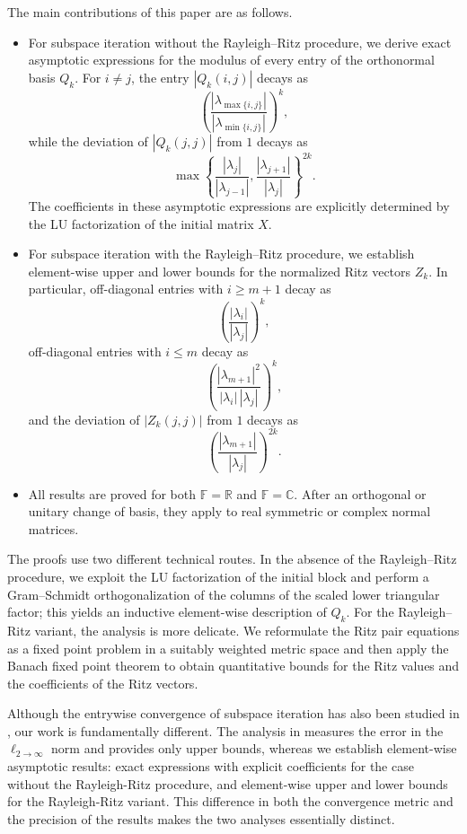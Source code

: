 \documentclass[11pt,a4paper]{article}
\theoremstyle{plain}              %
\theoremstyle{definition}         %
\begin{document}
The main contributions of this paper are as follows.
\begin{itemize}
\item For subspace iteration without the Rayleigh--Ritz procedure, we derive exact asymptotic expressions for the modulus of every entry of the orthonormal basis \(Q_k\). For \(i\ne j\), the entry \(|Q_k(i,j)|\) decays as
\[
\left(\frac{|\lambda_{\max\{i,j\}}|}{|\lambda_{\min\{i,j\}}|}\right)^k,
\]
while the deviation of \(|Q_k(j,j)|\) from \(1\) decays as
\[
\max\left\{\frac{|\lambda_j|}{|\lambda_{j-1}|},
\frac{|\lambda_{j+1}|}{|\lambda_j|}\right\}^{2k}.
\]
The coefficients in these asymptotic expressions are explicitly determined by the LU factorization of the initial matrix \(X\).
\item For subspace iteration with the Rayleigh--Ritz procedure, we establish element-wise upper and lower bounds for the normalized Ritz vectors \(Z_k\). In particular, off-diagonal entries with \(i\ge m+1\) decay as
\[
\left(\frac{|\lambda_i|}{|\lambda_j|}\right)^k,
\]
off-diagonal entries with \(i\le m\) decay as
\[
\left(\frac{|\lambda_{m+1}|^2}{|\lambda_i|\,|\lambda_j|}\right)^k,
\]
and the deviation of \(|Z_k(j,j)|\) from \(1\) decays as
\[
\left(\frac{|\lambda_{m+1}|}{|\lambda_j|}\right)^{2k}.
\]
\item All results are proved for both \(\mathbb{F}=\mathbb{R}\) and \(\mathbb{F}=\mathbb{C}\). After an orthogonal or unitary change of basis, they apply to real symmetric or complex normal matrices.
\end{itemize}

The proofs use two different technical routes. In the absence of the Rayleigh--Ritz procedure, we exploit the LU factorization of the initial block and perform a Gram--Schmidt orthogonalization of the columns of the scaled lower triangular factor; this yields an inductive element-wise description of \(Q_k\). For the Rayleigh--Ritz variant, the analysis is more delicate. We reformulate the Ritz pair equations as a fixed point problem in a suitably weighted metric space and then apply the Banach fixed point theorem to obtain quantitative bounds for the Ritz values and the coefficients of the Ritz vectors.

Although the entrywise convergence of subspace iteration has also been studied in \cite{NEURIPS2020_3d8e03e8}, our work is fundamentally different. The analysis in \cite{NEURIPS2020_3d8e03e8} measures the error in the \(\ell_{2\to\infty}\) norm and provides only upper bounds, whereas we establish element-wise asymptotic results: exact expressions with explicit coefficients for the case without the Rayleigh-Ritz procedure, and element-wise upper and lower bounds for the Rayleigh-Ritz variant. This difference in both the convergence metric and the precision of the results makes the two analyses essentially distinct.
\end{document}
